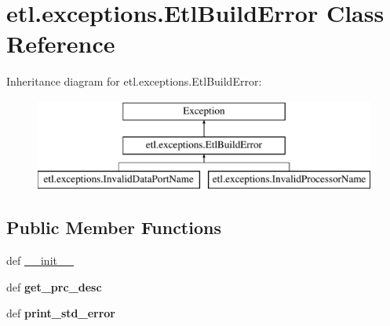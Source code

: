 \hypertarget{classetl_1_1exceptions_1_1EtlBuildError}{\section{etl.\-exceptions.\-Etl\-Build\-Error Class Reference}
\label{classetl_1_1exceptions_1_1EtlBuildError}
}
Inheritance diagram for etl.\-exceptions.\-Etl\-Build\-Error\-:\begin{figure}[H]
\begin{center}
\leavevmode
\includegraphics[height=3.000000cm]{classetl_1_1exceptions_1_1EtlBuildError}
\end{center}
\end{figure}
\subsection*{Public Member Functions}
\begin{DoxyCompactItemize}
\item 
def \hyperlink{classetl_1_1exceptions_1_1EtlBuildError_a4bc99a9d770dfa025deaa8f470181731}{\-\_\-\-\_\-init\-\_\-\-\_\-}
\item 
\hypertarget{classetl_1_1exceptions_1_1EtlBuildError_a6e6d78ffbbab68ef638a7a54cf3996f6}{def {\bfseries get\-\_\-prc\-\_\-desc}}\label{classetl_1_1exceptions_1_1EtlBuildError_a6e6d78ffbbab68ef638a7a54cf3996f6}

\item 
\hypertarget{classetl_1_1exceptions_1_1EtlBuildError_ac0dbb3448b32b9f49e070e46b555926a}{def {\bfseries print\-\_\-std\-\_\-error}}\label{classetl_1_1exceptions_1_1EtlBuildError_ac0dbb3448b32b9f49e070e46b555926a}

\end{DoxyCompactItemize}
